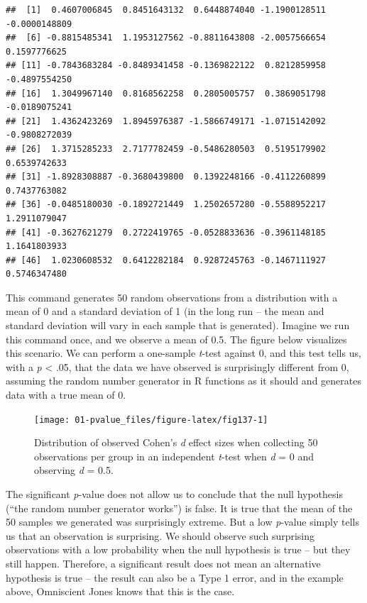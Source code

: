 \documentclass[
  oneside]{book}
\begin{document}
\begin{verbatim}
##  [1]  0.4607006845  0.8451643132  0.6448874040 -1.1900128511 -0.0000148809
##  [6] -0.8815485341  1.1953127562 -0.8811643808 -2.0057566654  0.1597776625
## [11] -0.7843683284 -0.8489341458 -0.1369822122  0.8212859958 -0.4897554250
## [16]  1.3049967140  0.8168562258  0.2805005757  0.3869051798 -0.0189075241
## [21]  1.4362423269  1.8945976387 -1.5866749171 -1.0715142092 -0.9808272039
## [26]  1.3715285233  2.7177782459 -0.5486280503  0.5195179902  0.6539742633
## [31] -1.8928308887 -0.3680439800  0.1392248166 -0.4112260899  0.7437763082
## [36] -0.0485180030 -0.1892721449  1.2502657280 -0.5588952217  1.2911079047
## [41] -0.3627621279  0.2722419765 -0.0528833636 -0.3961148185  1.1641803933
## [46]  1.0230608532  0.6412282184  0.9287245763 -0.1467111927  0.5746347480
\end{verbatim}

This command generates 50 random observations from a distribution with a mean of 0 and a standard deviation of 1 (in the long run -- the mean and standard deviation will vary in each sample that is generated). Imagine we run this command once, and we observe a mean of 0.5. The figure below visualizes this scenario. We can perform a one-sample \emph{t}-test against 0, and this test tells us, with a \emph{p} \textless{} .05, that the data we have observed is surprisingly different from 0, assuming the random number generator in R functions as it should and generates data with a true mean of 0.



\begin{figure}

{\centering \texttt{[image: 01-pvalue\_files/figure-latex/fig137-1]} 

}

\caption{Distribution of observed Cohen's \emph{d} effect sizes when collecting 50 observations per group in an independent \emph{t}-test when \emph{d} = 0 and observing \emph{d} = 0.5.}\label{fig:fig137}
\end{figure}

The significant \emph{p}-value does not allow us to conclude that the null hypothesis (``the random number generator works'') is false. It is true that the mean of the 50 samples we generated was surprisingly extreme. But a low \emph{p}-value simply tells us that an observation is surprising. We should observe such surprising observations with a low probability when the null hypothesis is true -- but they still happen. Therefore, a significant result does not mean an alternative hypothesis is true -- the result can also be a Type 1 error, and in the example above, Omniscient Jones knows that this is the case.
\end{document}
